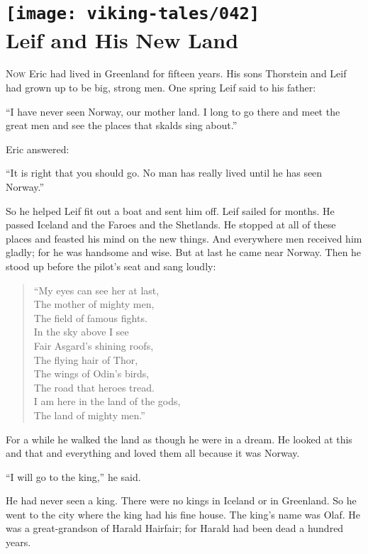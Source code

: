 \chapter[Leif and His New Land]{
    \texttt{[image: viking-tales/042]}\\
    Leif and His New Land}

\lettrine{N}{ow} Eric had lived in Greenland for fifteen years. His sons
Thorstein and Leif had grown up to be big, strong men. One spring Leif
said to his father:

``I have never seen Norway, our mother land. I long to go there and meet
the great men and see the places that skalds sing about.''

Eric answered:

``It is right that you should go. No man has really lived until he has
seen Norway.''

So he helped Leif fit out a boat and sent him off. Leif sailed for
months. He passed Iceland and the Faroes and the Shetlands. He stopped
at all of these places and feasted his mind on the new things. And
everywhere men received him gladly; for he was handsome and wise. But at
last he came near Norway. Then he stood up before the pilot's seat and
sang loudly:

\begin{quote}
``My eyes can see her at last,\\
The mother of mighty men,\\
The field of famous fights.\\
In the sky above I see\\
Fair Asgard's shining roofs,\\
The flying hair of Thor,\\
The wings of Odin's birds,\\
The road that heroes tread.\\
I am here in the land of the gods,\\
The land of mighty men.''
\end{quote}

For a while he walked the land as though he were in a dream. He looked
at this and that and everything and loved them all because it was
Norway.

``I will go to the king,'' he said.

He had never seen a king. There were no kings in Iceland or in
Greenland. So he went to the city where the king had his fine house. The
king's name was Olaf. He was a great-grandson of Harald Hairfair; for
Harald had been dead a hundred years.


